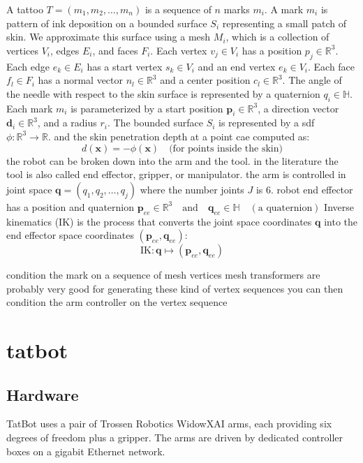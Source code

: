 \documentclass[11pt]{article}
\begin{document}
A tattoo $T = (m_1, m_2, \ldots, m_n)$ is a sequence of $n$ marks $m_i$.
A mark $m_i$ is pattern of ink deposition on a bounded surface $S_i$ representing a small patch of skin.
We approximate this surface using a mesh $M_i$, which is a collection of vertices $V_i$, edges $E_i$, and faces $F_i$.
Each vertex $v_j \in V_i$ has a position $p_j \in \mathbb{R}^3$.
Each edge $e_k \in E_i$ has a start vertex $s_k \in V_i$ and an end vertex $e_k \in V_i$.
Each face $f_l \in F_i$ has a normal vector $n_l \in \mathbb{R}^3$ and a center position $c_l \in \mathbb{R}^3$.
The angle of the needle with respect to the skin surface is represented by a quaternion $q_i \in \mathbb{H}$.
Each mark $m_i$ is parameterized by a start position \( \mathbf{p}_i \in \mathbb{R}^3 \), a direction vector \( \mathbf{d}_i \in \mathbb{R}^3 \), and a radius \( r_i \).
The bounded surface $S_i$ is represented by a sdf $\phi: \mathbb{R}^3 \to \mathbb{R}$.
and the skin penetration depth at a point cae computed as:
\[
d(\mathbf{x}) = -\phi(\mathbf{x}) \quad \text{(for points inside the skin)}
\]
the robot can be broken down into the arm and the tool.
in the literature the tool is also called end effector, gripper, or manipulator.
the arm is controlled in joint space $\mathbf{q} = (q_1, q_2, \ldots, q_j)$ where the number joints $J$ is $6$.
robot end effector has a position and quaternion $\mathbf{p}_{ee} \in \mathbb{R}^3 \quad \text{and} \quad \mathbf{q}_{ee} \in \mathbb{H} \quad (\text{a quaternion})$
Inverse kinematics (IK) is the process that converts the joint space coordinates \( \mathbf{q} \) into the end effector space coordinates \( (\mathbf{p}_{ee}, \mathbf{q}_{ee}) \):
\[
\text{IK}: \mathbf{q} \mapsto (\mathbf{p}_{ee}, \mathbf{q}_{ee})
\]

condition the mark on a sequence of mesh vertices
mesh transformers are probably very good for generating these kind of vertex sequences
you can then condition the arm controller on the vertex sequence

\section{tatbot}

\subsection{Hardware}

TatBot uses a pair of Trossen Robotics WidowXAI arms, each providing six degrees of freedom plus a gripper. The arms are driven by dedicated controller boxes on a gigabit Ethernet network.
\end{document}
